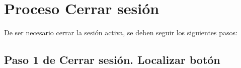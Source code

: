 \chapter{Proceso Cerrar sesión}
	De ser necesario cerrar la sesión activa, se deben seguir los
	siguientes pasos: 
\section{Paso 1 de Cerrar sesión. Localizar botón}
	
